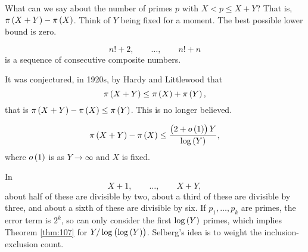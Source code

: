 
What can we say about the number of primes $ p $ with $ X < p \le X + Y $? That is, $ \pi\br{X + Y} - \pi\br{X} $. Think of $ Y $ being fixed for a moment. The best possible lower bound is zero.

\begin{example*}
$$ n! + 2, \qquad \dots, \qquad n! + n $$
is a sequence of consecutive composite numbers.
\end{example*}

It was conjectured, in 1920s, by Hardy and Littlewood that
$$ \pi\br{X + Y} \le \pi\br{X} + \pi\br{Y}, $$
that is $ \pi\br{X + Y} - \pi\br{X} \le \pi\br{Y} $. This is no longer believed.

\begin{theorem}
\label{thm:107}
$$ \pi\br{X + Y} - \pi\br{X} \le \dfrac{\br{2 + o\br{1}}Y}{\log\br{Y}}, $$
where $ o\br{1} $ is as $ Y \to \infty $ and $ X $ is fixed.
\end{theorem}

In
$$ X + 1, \qquad \dots, \qquad X + Y, $$
about half of these are divisible by two, about a third of these are divisible by three, and about a sixth of these are divisible by six. If $ p_1, \dots, p_k $ are primes, the error term is $ 2^k $, so can only consider the first $ \log\br{Y} $ primes, which implies Theorem \ref{thm:107} for $ Y / \log\br{\log\br{Y}} $. Selberg's idea is to weight the inclusion-exclusion count.

